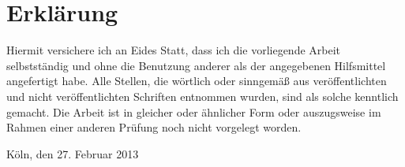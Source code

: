\section*{Erklärung}

Hiermit versichere ich an Eides Statt, dass ich die vorliegende Arbeit selbstständig und ohne die Benutzung anderer als der angegebenen Hilfsmittel angefertigt habe. 
Alle Stellen, die wörtlich oder sinngemäß aus veröffentlichten und nicht veröffentlichten Schriften entnommen wurden, sind als solche kenntlich gemacht. 
Die Arbeit ist in gleicher oder ähnlicher Form oder auszugsweise im Rahmen einer anderen Prüfung noch nicht vorgelegt worden.

\vspace{30mm}
\begin{flushleft}
    Köln, den 27. Februar 2013
\end{flushleft}